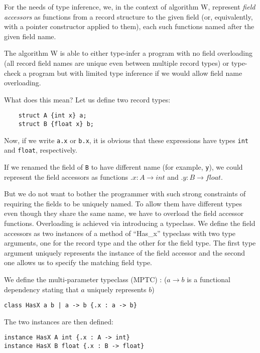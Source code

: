 For the needs of type inference, we, in the context of algorithm W, represent \emph{field accessors} as functions from a record structure to the given field (or, equivalently, with a pointer constructor applied to them), each such functions named after the given field name.

The algorithm W is able to either type-infer a program with no field overloading (all record field names are unique even between multiple record types) or type-check a program but with limited type inference if we would allow field name overloading.

What does this mean? Let us define two record types:

\begin{lstlisting}
    struct A {int x} a;
    struct B {float x} b;
\end{lstlisting}

Now, if we write \lstinline{a.x} or \lstinline{b.x}, it is obvious that these expressions have types \lstinline{int} and \lstinline{float}, respectively.

If we renamed the field of \lstinline{B} to have different name (for example, \lstinline{y}), we could represent the field accessors as functions $.x : A \to int$ and $.y : B \to float$.

But we do not want to bother the programmer with such strong constraints of requiring the fields to be uniquely named. To allow them have different types even though they share the same name, we have to overload the field accessor functions. Overloading is achieved via introducing a typeclass. We define the field accessors as two instances of a method  of ``Has\_x'' typeclass with two type arguments, one for the record type and the other for the field type. The first type argument uniquely represents the instance of the field accessor and the second one allows us to specify the matching field type.

We define the multi-parameter typeclass (MPTC) : ($a \to b$ is a functional dependency stating that $a$ uniquely represents $b$)

\begin{center}
    \lstinline/class HasX a b | a -> b {.x : a -> b}/
\end{center}

The two instances are then defined:

\begin{lstlisting}
instance HasX A int {.x : A -> int}
instance HasX B float {.x : B -> float}
\end{lstlisting}

